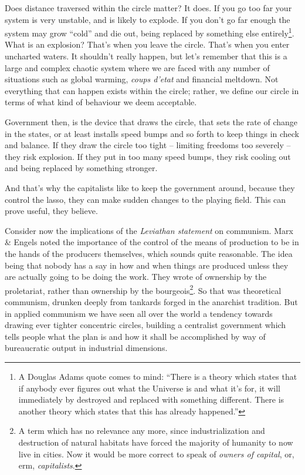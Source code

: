 Does distance traversed within the circle matter? It does. If you go too far
your system is very unstable, and is likely to explode. If you don't go far
enough the system may grow ``cold'' and die out, being replaced by something
else entirely\footnote{A Douglas Adams quote comes to mind: ``There is a theory
which states that if anybody ever f\hbox{}igures out what the Universe is and
what it's for, it will immediately by destroyed and replaced with something
dif\hbox{}ferent.  There is another theory which states that this has already
happened.''}. What is an explosion? That's when you leave the circle. That's
when you enter uncharted waters. It shouldn't really happen, but let's remember
that this is a large and complex chaotic system where we are faced with any
number of situations such as global warming, \textit{coups d'etat} and
f\hbox{}inancial meltdown. Not everything that can happen exists within the
circle; rather, we def\hbox{}ine our circle in terms of what kind of behaviour
we deem acceptable.

Government then, is the device that draws the circle, that sets the rate of
change in the states, or at least installs speed bumps and so forth to keep
things in check and balance. If they draw the circle too tight – limiting
freedoms too severely – they risk explosion. If they put in too many speed
bumps, they risk cooling out and being replaced by something stronger.

And that's why the capitalists like to keep the government around, because they
control the lasso, they can make sudden changes to the playing f\hbox{}ield.
This can prove useful, they believe.

Consider now the implications of the \textit{Leviathan statement} on communism.
Marx \& Engels noted the importance of the control of the means of production 
to be in the hands of the producers themselves, which sounds quite reasonable.
The idea being that nobody has a say in how and when things are produced unless
they are actually going to be doing the work. They wrote of ownership by the
proletariat, rather than ownership by the bourgeois\footnote{A term which has 
no relevance any more, since industrialization and destruction of natural
habitats have forced the majority of humanity to now live in cities. Now it
would be more correct to speak of \textit{owners of capital}, or, erm,
\textit{capitalists}.}.  So that was theoretical communism, drunken deeply from
tankards forged in the anarchist tradition. But in applied communism we have
seen all over the world a tendency towards drawing ever tighter concentric
circles, building a centralist government which tells people what the plan is
and how it shall be accomplished by way of bureaucratic output in industrial
dimensions.

